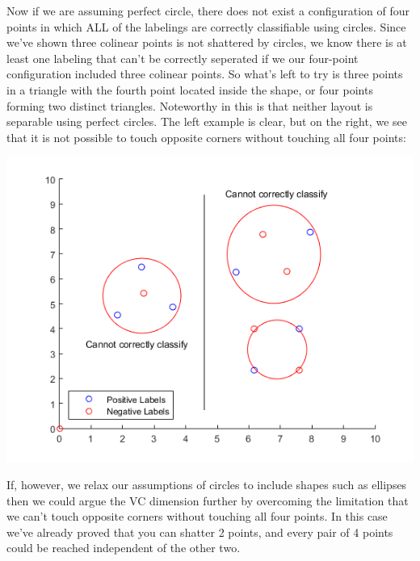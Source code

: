 \documentclass[11pt,a4paper]{article}
\begin{document}
\begin{itemize}
\begin{enumerate} [label={\alph*)}]
					Now if we are assuming perfect circle, there does not exist a configuration of four points in which ALL of the labelings are correctly classifiable using circles. Since we've shown three colinear points is not shattered by circles, we know there is at least one labeling that can't be correctly seperated if we our four-point configuration included three colinear points. So what's left to try is three points in a triangle with the fourth point located inside the shape, or four points forming two distinct triangles. Noteworthy in this is that neither layout is separable using perfect circles. The left example is clear, but on the right, we see that it is not possible to touch opposite corners without touching all four points:
					\begin{center}
						\includegraphics[width=1\linewidth]{q3a_4}
					\end{center}
									
					If, however, we relax our assumptions of circles to include shapes such as ellipses then we could argue the VC dimension further by overcoming the limitation that we can't touch opposite corners without touching all four points. In this case we've already proved that you can shatter 2 points, and every pair of 4 points could be reached independent of the other two.
					

\end{enumerate}
\end{itemize}
\end{document}
